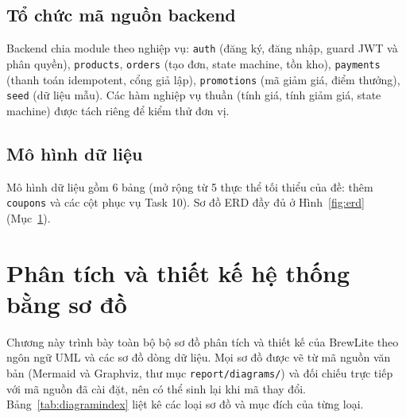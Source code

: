 \documentclass[a4paper]{article}
\begin{document}
\subsection{Tổ chức mã nguồn backend}
Backend chia module theo nghiệp vụ: \texttt{auth} (đăng ký, đăng nhập, guard JWT và phân quyền), \texttt{products}, \texttt{orders} (tạo đơn, state machine, tồn kho), \texttt{payments} (thanh toán idempotent, cổng giả lập), \texttt{promotions} (mã giảm giá, điểm thưởng), \texttt{seed} (dữ liệu mẫu). Các hàm nghiệp vụ thuần (tính giá, tính giảm giá, state machine) được tách riêng để kiểm thử đơn vị.

\subsection{Mô hình dữ liệu}
Mô hình dữ liệu gồm 6 bảng (mở rộng từ 5 thực thể tối thiểu của đề: thêm \texttt{coupons} và các cột phục vụ Task 10). Sơ đồ ERD đầy đủ ở Hình~\ref{fig:erd} (Mục~\ref{sec:design}).

\section{Phân tích và thiết kế hệ thống bằng sơ đồ}\label{sec:design}
Chương này trình bày toàn bộ bộ sơ đồ phân tích và thiết kế của BrewLite theo ngôn ngữ UML và các sơ đồ dòng dữ liệu. Mọi sơ đồ được vẽ từ mã nguồn văn bản (Mermaid và Graphviz, thư mục \texttt{report/diagrams/}) và đối chiếu trực tiếp với mã nguồn đã cài đặt, nên có thể sinh lại khi mã thay đổi. Bảng~\ref{tab:diagramindex} liệt kê các loại sơ đồ và mục đích của từng loại.
\end{document}
